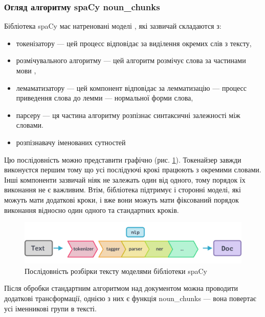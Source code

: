 \documentclass[14pt]{extarticle}
\begin{document}
  \subsubsection{Огляд алгоритму spaCy noun\_chunks}
  Бібліотека spaCy має натреновані моделі \cite{spacy_models,spacy_pipelines},
  які зазвичай складаются з:
  \begin{itemize}[labelindent=\dimexpr{}\relax, leftmargin=*]
    \item токенізатору \cite{wiki_tokenizer,spacy_tokenizer} ---
      цей процесс відповідає за виділення окремих слів з тексту,
    \item розмічувального алгоритму \cite{spacy_tagger} ---
      цей алгоритм розмічує слова за частинами мови \cite{wiki_pos_tagging},
    \item лемаматизатору \cite{spacy_lemmatizer} ---
      цей компонент відповідає за лемматизацію \cite{wiki_lemmatization} ---
      процесс приведення слова до лемми \cite{wiki_lemma} ---
      нормальної форми слова,
    \item парсеру \cite{spacy_dependency_parser} --- ця частина алгоритму розпізнає синтаксичні
    залежності між словами.
    \item розпізнавачу іменованих сутностей \cite{wiki_ner, spacy_er}
  \end{itemize}

  Цю послідовність можно представити графічно (рис. \ref{fig:spacy_pipeline}).
  Токенайзер завжди виконуєтся першим
  тому що усі послідуючі крокі працюють з окремими словами.
  Інші компоненти зазвичай ніяк не залежать один від одного,
  тому порядок їх виконання не є важливим. Втім,
  бібліотека підтримує і сторонні моделі, які можуть мати додаткові кроки,
  і вже вони можуть мати фіксований порядок виконання відносно один одного
  та стандартних кроків.

  \begin{figure}[H]
    \centering
    \includegraphics[width=\textwidth]{spacy_pipeline.png}    
    \caption{Послідовність розбірки тексту моделями бібліотеки spaCy}
    \label{fig:spacy_pipeline}
  \end{figure}

  Після обробки стандартним алгоритмом над документом можна проводити додаткові
  трансформації, однією з них є функція noun\_chunks
  \cite{spacy_noun_chunks} ---
  вона повертає усі іменникові групи \cite{wiki_noun_phrase} в тексті.
\end{document}
